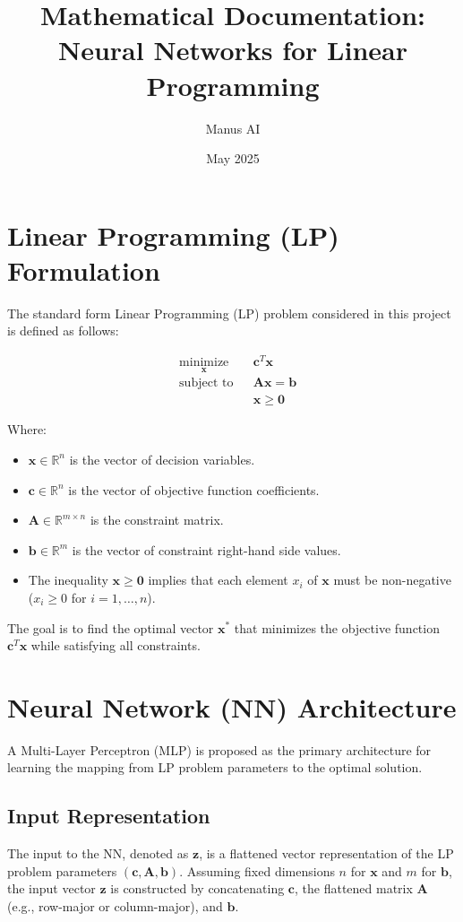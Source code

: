 \documentclass{article}
\title{Mathematical Documentation: Neural Networks for Linear Programming}
\author{Manus AI}
\date{May 2025}
\begin{document}
\maketitle

\section{Linear Programming (LP) Formulation}

The standard form Linear Programming (LP) problem considered in this project is defined as follows:

\begin{equation}
\begin{aligned}
& \underset{\mathbf{x}}{\text{minimize}} & & \mathbf{c}^T \mathbf{x} \\
& \text{subject to} & & \mathbf{A} \mathbf{x} = \mathbf{b} \\
& & & \mathbf{x} \ge \mathbf{0}
\end{aligned}
\end{equation}

Where:
\begin{itemize}
    \item $\mathbf{x} \in \mathbb{R}^n$ is the vector of decision variables.
    \item $\mathbf{c} \in \mathbb{R}^n$ is the vector of objective function coefficients.
    \item $\mathbf{A} \in \mathbb{R}^{m \times n}$ is the constraint matrix.
    \item $\mathbf{b} \in \mathbb{R}^m$ is the vector of constraint right-hand side values.
    \item The inequality $\mathbf{x} \ge \mathbf{0}$ implies that each element $x_i$ of $\mathbf{x}$ must be non-negative ($x_i \ge 0$ for $i=1, \dots, n$).
\end{itemize}

The goal is to find the optimal vector $\mathbf{x}^*$ that minimizes the objective function $\mathbf{c}^T \mathbf{x}$ while satisfying all constraints.

\section{Neural Network (NN) Architecture}

A Multi-Layer Perceptron (MLP) is proposed as the primary architecture for learning the mapping from LP problem parameters to the optimal solution.

\subsection{Input Representation}
The input to the NN, denoted as $\mathbf{z}$, is a flattened vector representation of the LP problem parameters $(\mathbf{c}, \mathbf{A}, \mathbf{b})$. Assuming fixed dimensions $n$ for $\mathbf{x}$ and $m$ for $\mathbf{b}$, the input vector $\mathbf{z}$ is constructed by concatenating $\mathbf{c}$, the flattened matrix $\mathbf{A}$ (e.g., row-major or column-major), and $\mathbf{b}$.
\end{document}
